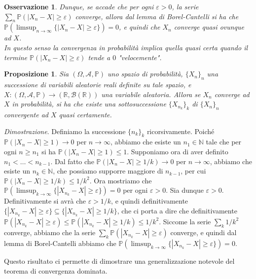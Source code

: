 \documentclass[11pt]{book}
\makeatletter
\theoremstyle{Definizione}
\theoremstyle{TeoremaProposizioneLemmaCorollario}
\newtheorem{mypropo}[myteo]{Proposizione}
\theoremstyle{OsservazioneNota}
\newtheorem{myobs}{Osservazione}[section]
\renewenvironment{proof}[1][\proofname]{\par
  \normalfont \topsep6\p@\@plus6\p@\relax
  \trivlist
  \item[\hskip\labelsep
        \itshape
    #1\@addpunct{.}]\ignorespaces
}{%
  \endtrivlist\@endpefalse
}
\newcommand{\R}{\mathbb{R}}
\newcommand{\N}{\mathbb{N}}
\renewcommand{\P}{\mathbb{P}}
\renewenvironment{proof}{\textsl{Dimostrazione}.}{}
\makeatother
\begin{document}
\begin{myobs}
Dunque, se accade che per ogni $\varepsilon > 0$, la serie $\sum_n \P(|X_n-X|\geq \varepsilon)$ converge, allora dal lemma di Borel-Cantelli si ha che $\P(\limsup_{n\to\infty} \{|X_n-X|\geq \varepsilon\}) = 0$, e quindi che $X_n$ converge quasi ovunque ad $X$.\\
In questo senso la convergenza in probabilità implica quella quasi certa quando il termine $\P(|X_n-X| \geq \varepsilon)$ tende a $0$ "velocemente".
\end{myobs}
\begin{boxpro}
\begin{mypropo}
Sia $(\Omega,\mathcal{A},\P)$ uno spazio di probabilità, $\{X_n\}_n$ una successione di variabili aleatorie reali definite su tale spazio, e $X:(\Omega,\mathcal{A},\P)\longrightarrow (\R,\mathcal{B}(\R))$ una variabile aleatoria. Allora se $X_n$ converge ad $X$ in probabilità, si ha che esiste una sottosuccessione $\{X_{n_k}\}_k$ di $\{X_n\}_n$ convergente ad $X$ quasi certamente.
\end{mypropo}
\tcblower
\begin{proof}
Definiamo la successione $\{n_k\}_k$ ricorsivamente. Poiché $\P(|X_n-X| \geq 1) \to 0$ per $n\to \infty$, abbiamo che esiste un $n_1\in \N$ tale che per ogni $n\geq n_1$ si ha $\P(|X_n-X| \geq 1) \leq 1$. Supponiamo ora di aver definito $n_1<\dots<n_{k-1}$. Dal fatto che $\P(|X_n-X| \geq 1/k) \to 0$ per $n\to\infty$, abbiamo che esiste un $n_k \in \N$, che possiamo supporre maggiore di $n_{k-1}$, per cui $\P(|X_n-X|\geq 1/k) \leq 1/k^2$. Ora mostriamo che $\P(\limsup_{k\to\infty} \{|X_{n_k}-X| \geq \varepsilon\}) = 0$ per ogni $\varepsilon > 0$. Sia dunque $\varepsilon > 0$. Definitivamente si avrà che $\varepsilon > 1/k$, e quindi definitivamente $\{|X_{n_k} -X| \geq \varepsilon\} \subseteq \{|X_{n_k}-X| \geq 1/k\}$, che ci porta a dire che definitivamente $\P(|X_{n_k}-X|\geq \varepsilon) \leq \P(|X_{n_k}-X| \geq 1/k)\leq 1/k^2$. Siccome la serie $\sum_k 1/k^2$ converge, abbiamo che la serie $\sum_{k} \P(|X_{n_k}-X|\geq \varepsilon)$ converge, e quindi dal lemma di Borel-Cantelli abbiamo che $\P(\limsup_{k\to\infty} \{|X_{n_k}-X|\geq \varepsilon\}) = 0$. 
\end{proof}
\end{boxpro}
\noindent
Questo risultato ci permette di dimostrare una generalizzazione notevole del teorema di convergenza dominata.
\end{document}

